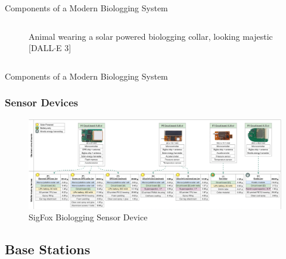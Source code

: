 \documentclass{beamer}
\begin{document}
\begin{frame}{Components of a Modern Biologging System}
\begin{columns}
\begin{column}{0.5\textwidth}
\begin{figure}[htbp]
          \caption{Animal wearing a solar powered biologging collar, looking majestic [DALL$\cdot$E 3]}
          \label{fig:Solar_collar}
        \end{figure}
    \end{column}
    \end{columns}
  \end{frame}

  \begin{frame}{Components of a Modern Biologging System}
    \frametitle{Sensor Devices}
    \begin{figure}[htbp]
      \centering
      \includegraphics[width=\textwidth]{images/SigFox_Sensor_device.png}
      \caption{SigFox Biologging Sensor Device \cite{wild2023multi}}
      \label{fig:SigFox_Biologging_device}
    \end{figure}
  \end{frame}

\subsection{Base Stations}
\end{document}

